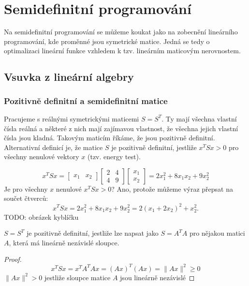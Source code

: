 \chapter{Semidefinitní programování}

Na semidefinitní programování se můžeme koukat jako na zobecnění lineárního programování, kde proměnné jsou symetrické matice. Jedná se tedy o optimalizaci lineární funkce vzhledem k tzv. lineárním maticovým nerovnostem.

\section{Vsuvka z lineární algebry}

\subsection*{Pozitivně definitní a semidefinitní matice}

Pracujeme s reálnými symetrickými maticemi $S = S^T$. Ty mají všechna vlastní čísla reálná a některé z nich mají zajímavou vlastnost, že všechna jejich vlastní čísla jsou kladná. Takovým maticím říkáme, že jsou pozitivně definitní. Alternativní definicí je, že matice $S$ je pozitivně definitní, jestliže $x^TSx > 0$ pro všechny nenulové vektory $x$ (tzv. energy test).

\begin{pr}
$$
    x^T S x = 
    \begin{bmatrix}
        x_1 & x_2
    \end{bmatrix}
    \begin{bmatrix}
        2 & 4 \\
        4 & 9
    \end{bmatrix}
    \begin{bmatrix}
        x_1 \\
        x_2
    \end{bmatrix} =
    2 x_1^2 + 8 x_1 x_2 + 9 x_2^2
$$
Je pro všechny $x$ nenulové $x^TSx > 0$? Ano, protože můžeme výraz přepsat na součet čtverců:
$$
    x^TSx = 2 x_1^2 + 8 x_1 x_2 + 9 x_2^2 = 2 (x_1 + 2 x_2)^2 + x_2^2.
$$
TODO: obrázek kyblíčku
\end{pr}


\begin{vt}
    $S = S^T$ je pozitivně definitní, jestliže lze napsat jako $S = A^T A$ pro nějakou matici $A$, která má lineárně nezávislé sloupce.
\end{vt}
\begin{proof}
    \begin{equation}
    \label{eq:tmp}
        x^TSx = x^TA^TAx = (Ax)^T(Ax) = \lVert Ax \rVert^2 \geq 0
    \end{equation}
    $\lVert Ax \rVert^2 > 0$ jestliže sloupce matice $A$ jsou lineárně nezávislé
\end{proof}

